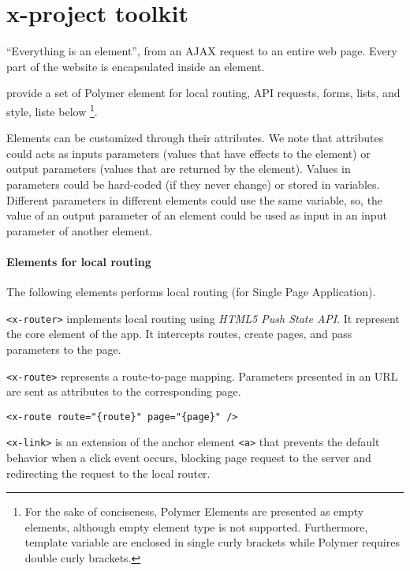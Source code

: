 \section{x-project toolkit}\label{sec:toolkit}

``Everything is an element'', from an AJAX request to an entire web page. Every part of the website is encapsulated inside an element. 

 provide a set of Polymer element for local routing, API requests, forms, lists, and style, liste below \footnote{\scriptsize For the sake of conciseness, Polymer Elements are presented as empty elements, although empty element type is not supported. Furthermore, template variable are enclosed in single curly brackets while Polymer requires double curly brackets.}. 

Elements can be customized through their attributes. We note that attributes could acts as inputs parameters (values that have effects to the element) or output parameters (values that are returned by the element).
Values in parameters could be hard-coded (if they never change) or stored in variables.
Different parameters in different elements could use the same variable, so, the value of an output parameter of an element could be used as input in an input parameter of another element.

\paragraph{Elements for local routing}

The following elements performs local routing (for Single Page Application).

\vspace{0.2cm}

\texttt{<x-router>} implements local routing using \emph{HTML5 Push State API}. It represent the core element of the app. It intercepts routes, create pages, and pass parameters to the page.

\vspace{0.2cm}

\texttt{<x-route>} represents a route-to-page mapping. 
Parameters presented in an URL are sent as attributes to the corresponding page.

\begin{lstlisting}[language=HTML5]
<x-route route="{route}" page="{page}" />
\end{lstlisting}

\texttt{<x-link>} is an extension of the anchor element \texttt{<a>} that prevents the default behavior when a click event occurs, blocking page request to the server and redirecting the request to the local router. 

